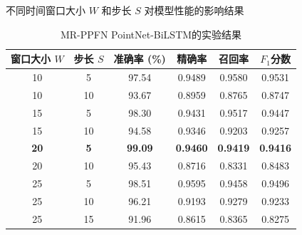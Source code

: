 \begin{table}[htbp]
    \caption{不同时间窗口大小 $W$ 和步长 $S$ 对模型性能的影响结果}
    \label{tab:window_step_performance}
    \centering 

    \begin{subtable}{\linewidth}
        \centering
        \caption{MR-PPFN PointNet-BiLSTM的实验结果}
        \begin{tabular}{cc|cccc}
            \toprule
            窗口大小 $W$ & 步长 $S$ & 准确率 (\%) & 精确率 & 召回率 & $F_1$分数 \\
            \midrule
            10 & 5 & 97.54 & 0.9489 & 0.9580 & 0.9531 \\
            10 & 10 & 93.67 & 0.8959 & 0.8765 & 0.8747 \\
            15 & 5 & 98.30 & 0.9431 & 0.9517 & 0.9447 \\
            15 & 10 & 94.58 & 0.9346 & 0.9203 & 0.9257 \\
            \textbf{20} & \textbf{5} & \textbf{99.09} & \textbf{0.9460} & \textbf{0.9419} & \textbf{0.9416} \\
            20 & 10 & 95.43 & 0.8716 & 0.8331 & 0.8483 \\
            25 & 5 & 98.51 & 0.9595 & 0.9458 & 0.9496 \\
            25 & 10 & 96.21 & 0.9193 & 0.9279 & 0.9233 \\
            25 & 15 & 91.96 & 0.8615 & 0.8365 & 0.8275 \\
            \bottomrule
        \end{tabular}
        \label{tab:MR-PPFN PointNet-BiLSTM_window_step_performance}
    \end{subtable} 

    \vspace{0.4cm} 


\end{table}
